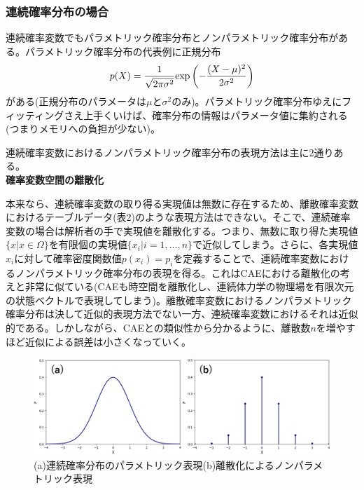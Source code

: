 \documentclass[dvipdfmx, 9pt, a4paper]{jsarticle}
\begin{document}
\subsubsection{連続確率分布の場合}
連続確率変数でもパラメトリック確率分布とノンパラメトリック確率分布がある。パラメトリック確率分布の代表例に正規分布
\begin{equation}
p(X)=\frac{1}{\sqrt{2\pi \sigma^2}}{\rm exp}\left( -\frac{(X-\mu)^2}{2\sigma^2} \right) \notag
\end{equation}
がある(正規分布のパラメータは$\mu$と$\sigma^2$のみ)。パラメトリック確率分布ゆえにフィッティングさえ上手くいけば、確率分布の情報はパラメータ値に集約される(つまりメモリへの負担が少ない)。\par
連続確率変数におけるノンパラメトリック確率分布の表現方法は主に2通りある。\bigskip \\
{\bf 確率変数空間の離散化}\par
本来なら、連続確率変数の取り得る実現値は無数に存在するため、離散確率変数におけるテーブルデータ(表2)のような表現方法はできない。そこで、連続確率変数の場合は解析者の手で実現値を離散化する。つまり、無数に取り得た実現値$\{ x|x \in \Omega \}$を有限個の実現値$\{ x_i|i=1,...,n \}$で近似してしまう。さらに、各実現値$x_i$に対して確率密度関数値$p(x_i)=p_i$を定義することで、連続確率変数におけるノンパラメトリック確率分布の表現を得る。これはCAEにおける離散化の考えと非常に似ている(CAEも時空間を離散化し、連続体力学の物理場を有限次元の状態ベクトルで表現してしまう)。離散確率変数におけるノンパラメトリック確率分布は決して近似的表現方法でない一方、連続確率変数におけるそれは近似的である。しかしながら、CAEとの類似性から分かるように、離散数$n$を増やすほど近似による誤差は小さくなっていく。\par

\begin{figure}[t]
\begin{center}
\includegraphics[width=14cm]{"fig2.png"}
\caption{(a)連続確率分布のパラメトリック表現(b)離散化によるノンパラメトリック表現}
\end{center}
\end{figure}
\end{document}
